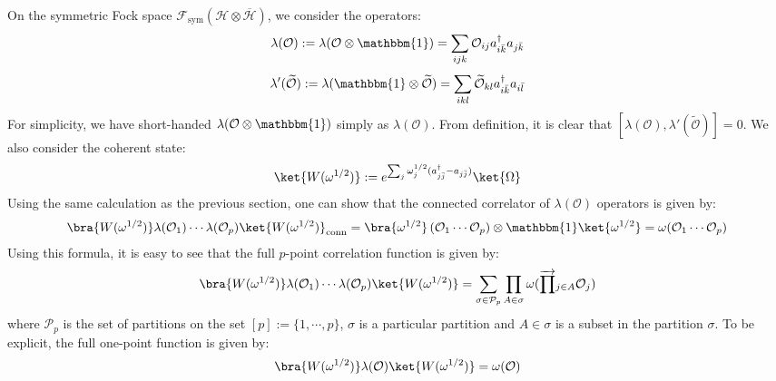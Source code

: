 \documentclass[a4paper,11pt]{article}
\theoremstyle{definition}
\numberwithin{equation}{section}
\newcommand{\lb}{\left(}
\newcommand{\rb}{\right)}
\begin{document}
On the symmetric Fock space $\mathcal{F}_\text{sym}(\mathcal{H}\otimes\overline{\mathcal{H}})$, we consider the operators:
\begin{equation}\label{equation:poisslambda}
    \lambda(\mathcal{O}):=\lambda(\mathcal{O}\otimes \mathbbm{1}) = \sum_{ijk}\mathcal{O}_{ij}a^{\dagger}_{i\bar{k}}a_{j\bar{k}}
\end{equation}
\begin{equation}\label{equation:poisslambda'}
    \lambda'(\widetilde{\mathcal{O}}) := \lambda(\mathbbm{1}\otimes \widetilde{\mathcal{O}}) = \sum_{ikl}\widetilde{\mathcal{O}}_{kl}a^\dagger_{i\bar{k}}a_{i\bar{l}}
\end{equation}
For simplicity, we have short-handed $\lambda(\mathcal{O}\otimes\mathbbm{1})$ simply as $\lambda(\mathcal{O})$. From definition, it is clear that $[\lambda(\mathcal{O}), \lambda'(\widetilde{\mathcal{O}})] = 0$. We also consider the coherent state:
\begin{equation}
    \ket{W(\omega^{1/2})} := e^{\sum_j \omega_j^{1/2}(a^\dagger_{j\bar{j}} - a_{j\bar{j}})}\ket{\Omega}
\end{equation}
Using the same calculation as the previous section, one can show that the connected correlator of $\lambda(\mathcal{O})$ operators is given by:
\begin{align}
    \begin{split}
        \bra{W(\omega^{1/2})}\lambda(\mathcal{O}_1)\cdots\lambda(\mathcal{O}_p)\ket{W(\omega^{1/2})}_\text{conn} = \bra{\omega^{1/2}}\lb \mathcal{O}_1\cdots\mathcal{O}_p\rb\otimes\mathbbm{1}\ket{\omega^{1/2}} = \omega(\mathcal{O}_1\cdots\mathcal{O}_p)
    \end{split}
\end{align}
Using this formula, it is easy to see that the full $p$-point correlation function is given by:
\begin{equation}
    \bra{W(\omega^{1/2})}\lambda(\mathcal{O}_1)\cdots\lambda(\mathcal{O}_p)\ket{W(\omega^{1/2})} = \sum_{\sigma\in\mathcal{P}_p}\prod_{A\in\sigma}\omega(\overrightarrow{\prod}_{j\in A}\mathcal{O}_j)
\end{equation}
where $\mathcal{P}_p$ is the set of partitions on the set $[p]:=\{1,\cdots,p\}$, $\sigma$ is a particular partition and $A\in\sigma$ is a subset in the partition $\sigma$. To be explicit, the full one-point function is given by:
\begin{equation}
    \bra{W(\omega^{1/2})}\lambda(\mathcal{O})\ket{W(\omega^{1/2})} = \omega(\mathcal{O})
\end{equation}
\end{document}
